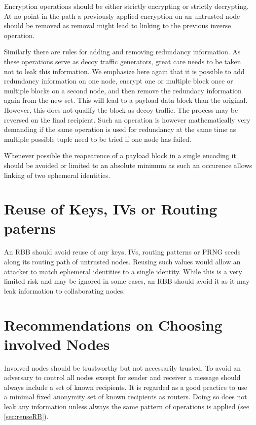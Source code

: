 Encryption operations should be either strictly encrypting or strictly decrypting. At no point in the path a previously applied encryption on an untrusted node should be removed as removal might lead to linking to the previous inverse operation.

Similarly there are rules for adding and removing redundancy information. As these operations serve as decoy traffic generators, great care needs to be taken not to leak this information. We emphasize here again that it is possible to add redundancy information on one node, encrypt one or multiple block once or multiple blocks on a second node, and then remove the redundacy information again from the new set. This will lead to a payload data block than the original. However, this does not qualify the block as decoy traffic. The process may be reversed on the final recipient. Such an operation is however mathematically very demanding if the same operation is used for redundancy at the same time as multiple possible tuple need to be tried if one node has failed.

Whenever possible the reapearence of a payload block in a single encoding it should be avoided or limited to an absolute minimum as such an occurence allows linking of two ephemeral identities.

\section{Reuse of Keys, IVs or Routing paterns}
An RBB should avoid reuse of any keys, IVs, routing patterns or PRNG seeds along its routing path of untrusted nodes. Reusing such values would allow an attacker to match ephemeral identities to a single identity. While this is a very limited risk and may be ignored in some cases, an RBB should avoid it as it may leak information to collaborating nodes.

\section{Recommendations on Choosing involved Nodes}
Involved nodes should be trustworthy but not necessarily trusted. To avoid an adversary to control all nodes except for sender and receiver a message should always include a set of known recipients. It is regarded as a good practice to use a minimal fixed anonymity set of known recipients as routers. Doing so does not leak any information unless always the same pattern of operations is applied (see \ref{sec:reuseRB}).

